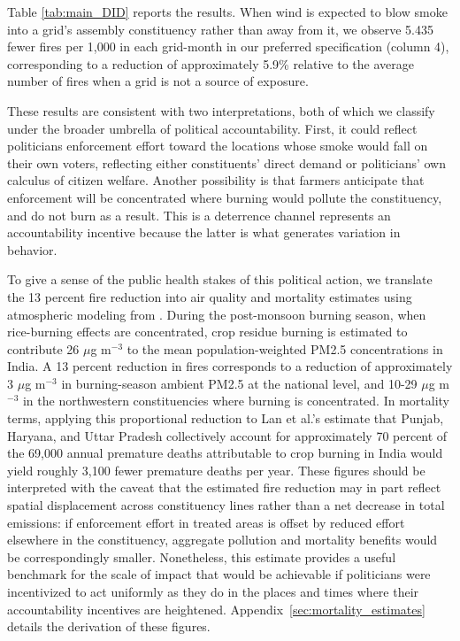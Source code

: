 \documentclass[12pt]{article}
\begin{document}
Table \ref{tab:main_DID} reports the results. When wind is expected to blow smoke into a grid's assembly constituency rather than away from it, we observe 5.435 fewer fires per 1,000 in each grid-month in our preferred specification (column 4), corresponding to a reduction of approximately 5.9\% relative to the average number of fires when a grid is not a source of exposure.


 These results are consistent with two interpretations, both of which we classify under the broader umbrella of political accountability. First, it could reflect politicians enforcement effort toward the locations whose smoke would fall on their own voters, reflecting either constituents' direct demand or  politicians' own calculus of citizen welfare. Another possibility is that farmers anticipate that enforcement will be concentrated where burning would pollute the constituency, and do not burn as a result. This is a deterrence channel represents an accountability incentive because the latter is what generates variation in behavior.



To give a sense of the public health stakes of this political action, we translate the 13 percent fire reduction into air quality and mortality estimates using atmospheric modeling from \citet{lan2022air}. During the post-monsoon burning season, when rice-burning effects are concentrated, crop residue burning is estimated to contribute 26 $\mu$g m$^{-3}$ to the mean population-weighted PM2.5 concentrations in India. A 13 percent reduction in fires corresponds to a reduction of approximately 3 $\mu$g m$^{-3}$ in burning-season ambient PM2.5 at the national level, and 10-29 $\mu$g m$^{-3}$ in the northwestern constituencies where burning is concentrated. In mortality terms, applying this proportional reduction to Lan et al.'s estimate that Punjab, Haryana, and Uttar Pradesh collectively account for approximately 70 percent of the 69,000 annual premature deaths attributable to crop burning in India would yield roughly 3,100 fewer premature deaths per year. These figures should be interpreted with the caveat that the estimated fire reduction may in part reflect spatial displacement across constituency lines rather than a net decrease in total emissions: if enforcement effort in treated areas is offset by reduced effort elsewhere in the constituency, aggregate pollution and mortality benefits would be correspondingly smaller. Nonetheless, this estimate provides a useful benchmark for the scale of impact that would be achievable if politicians were incentivized to act uniformly as they do in the places and times where their accountability incentives are heightened. Appendix~\ref{sec:mortality_estimates} details the derivation of these figures.
\end{document}
